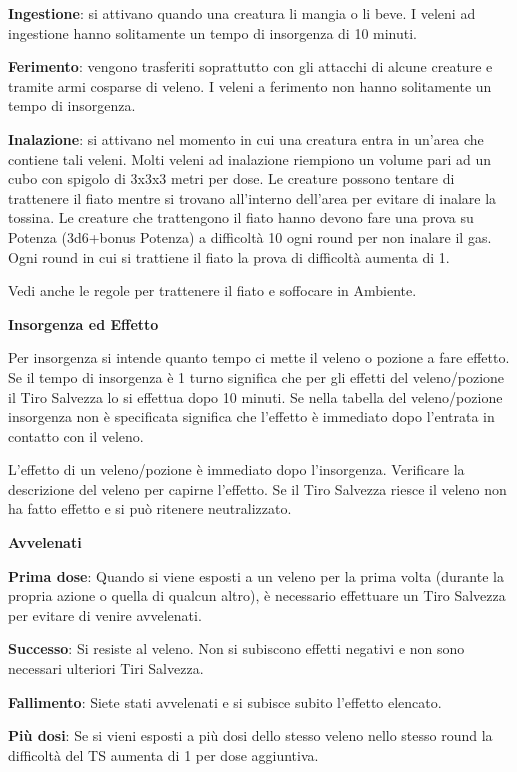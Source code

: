 \documentclass[a4paper,11pt,twoside,openany]{book}
\begin{document}
\textbf{Ingestione}: si attivano quando una creatura li mangia o li beve. I veleni ad ingestione hanno solitamente un tempo di insorgenza di 10 minuti.

\textbf{Ferimento}: vengono trasferiti soprattutto con gli attacchi di alcune creature e tramite armi cosparse di veleno. I veleni a ferimento non hanno solitamente un tempo di insorgenza.

\textbf{Inalazione}: si attivano nel momento in cui una creatura entra in un'area che contiene tali veleni. Molti veleni ad inalazione riempiono un volume pari ad un cubo con spigolo di 3x3x3 metri per dose. Le creature possono tentare di trattenere il fiato mentre si trovano all'interno dell'area per evitare di inalare la tossina. Le creature che trattengono il fiato hanno devono fare una prova su Potenza (3d6+bonus Potenza) a difficoltà 10 ogni round per non inalare il gas. Ogni round in cui si trattiene il fiato la prova di difficoltà aumenta di 1.

Vedi anche le regole per trattenere il fiato e soffocare in Ambiente.

\textbf{Insorgenza ed Effetto}

Per insorgenza si intende quanto tempo ci mette il veleno o pozione a fare effetto. Se il tempo di insorgenza è 1 turno significa che per gli effetti del veleno/pozione il Tiro Salvezza lo si effettua dopo 10 minuti. Se nella tabella del veleno/pozione insorgenza non è specificata significa che l'effetto è immediato dopo l'entrata in contatto con il veleno.

L'effetto di un veleno/pozione è immediato dopo l'insorgenza. Verificare la descrizione del veleno per capirne l'effetto. Se il Tiro Salvezza riesce il veleno non ha fatto effetto e si può ritenere neutralizzato.

\bigskip

\textbf{Avvelenati}

\textbf{Prima dose}: Quando si viene esposti a un veleno per la prima volta (durante la propria azione o quella di qualcun altro), è necessario effettuare un Tiro Salvezza per evitare di venire avvelenati.

\textbf{Successo}: Si resiste al veleno. Non si subiscono effetti negativi e non sono necessari ulteriori Tiri Salvezza.

\textbf{Fallimento}: Siete stati avvelenati e si subisce subito l'effetto elencato.

\textbf{Più dosi}: Se si vieni esposti a più dosi dello stesso veleno nello stesso round la difficoltà del TS aumenta di 1 per dose aggiuntiva.
\end{document}
